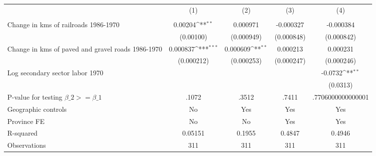 {
\def\sym#1{\ifmmode^{#1}\else\(^{#1}\)\fi}
\begin{tabular}{l*{4}{c}}
\hline\hline
                &\multicolumn{1}{c}{(1)}&\multicolumn{1}{c}{(2)}&\multicolumn{1}{c}{(3)}&\multicolumn{1}{c}{(4)}\\
                &\multicolumn{1}{c}{}&\multicolumn{1}{c}{}&\multicolumn{1}{c}{}&\multicolumn{1}{c}{}\\
\hline
Change in kms of railroads 1986-1970&  0.00204\sym{**} & 0.000971         &-0.000327         &-0.000384         \\
                &(0.00100)         &(0.000949)         &(0.000848)         &(0.000842)         \\
[1em]
Change in kms of paved and gravel roads 1986-1970& 0.000837\sym{***}& 0.000609\sym{**} & 0.000213         & 0.000231         \\
                &(0.000212)         &(0.000253)         &(0.000247)         &(0.000246)         \\
[1em]
Log secondary sector labor 1970&                  &                  &                  &  -0.0732\sym{**} \\
                &                  &                  &                  & (0.0313)         \\
\hline
P-value for testing $\beta\_{2} >= \beta\_{1}$&    .1072         &    .3512         &    .7411         &.7706000000000001         \\
Geographic controls&       No         &      Yes         &      Yes         &      Yes         \\
Province FE     &       No         &       No         &      Yes         &      Yes         \\
R-squared       &  0.05151         &   0.1955         &   0.4847         &   0.4946         \\
Observations    &      311         &      311         &      311         &      311         \\
\hline\hline
\end{tabular}
}
